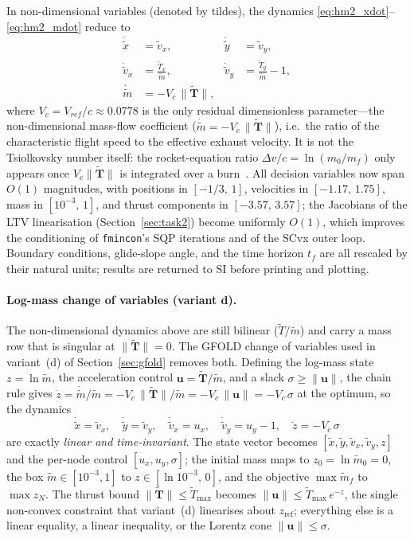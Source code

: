 \documentclass[../main.tex]{subfiles}
\begin{document}
In non-dimensional variables (denoted by tildes), the dynamics \eqref{eq:hm2_xdot}--\eqref{eq:hm2_mdot} reduce to
\begin{align}
    \dot{\tilde{x}}    &= \tilde{v}_x,
    & \dot{\tilde{y}}  &= \tilde{v}_y,\\
    \dot{\tilde{v}}_x  &= \frac{\tilde{T}_x}{\tilde{m}},
    & \dot{\tilde{v}}_y &= \frac{\tilde{T}_y}{\tilde{m}} - 1,\\
    \dot{\tilde{m}}    &= -V_c\,\|\tilde{\mathbf{T}}\|,
\end{align}
where $V_c = V_{ref}/c \approx 0.0778$ is the only residual dimensionless parameter---the non-dimensional mass-flow coefficient ($\dot{\tilde{m}} = -V_c\,\|\tilde{\mathbf{T}}\|$), i.e.\ the ratio of the characteristic flight speed to the effective exhaust velocity. It is not the Tsiolkovsky number itself: the rocket-equation ratio $\Delta v/c = \ln(m_0/m_f)$ only appears once $V_c\|\tilde{\mathbf{T}}\|$ is integrated over a burn~\cite[Sec.~3.8.3]{benedikter2022}. All decision variables now span $O(1)$ magnitudes, with positions in $[-1/3,\,1]$, velocities in $[-1.17,\,1.75]$, mass in $[10^{-3},\,1]$, and thrust components in $[-3.57,\,3.57]$; the Jacobians of the LTV linearisation (Section~\ref{sec:task2}) become uniformly $O(1)$, which improves the conditioning of \texttt{fmincon}'s SQP iterations and of the SCvx outer loop. Boundary conditions, glide-slope angle, and the time horizon $t_f$ are all rescaled by their natural units; results are returned to SI before printing and plotting.

\paragraph{Log-mass change of variables (variant d).} The non-dimensional dynamics above are still bilinear ($\tilde{T}/\tilde{m}$) and carry a mass row that is singular at $\|\tilde{\mathbf{T}}\|=0$. The GFOLD change of variables used in variant~(d) of Section~\ref{sec:gfold} removes both. Defining the log-mass state $z = \ln\tilde{m}$, the acceleration control $\mathbf{u} = \tilde{\mathbf{T}}/\tilde{m}$, and a slack $\sigma \geq \|\mathbf{u}\|$, the chain rule gives $\dot z = \dot{\tilde{m}}/\tilde{m} = -V_c\,\|\tilde{\mathbf{T}}\|/\tilde{m} = -V_c\,\|\mathbf{u}\| = -V_c\,\sigma$ at the optimum, so the dynamics
\begin{equation}
    \dot{\tilde{x}} = \tilde{v}_x,\quad
    \dot{\tilde{y}} = \tilde{v}_y,\quad
    \dot{\tilde{v}}_x = u_x,\quad
    \dot{\tilde{v}}_y = u_y - 1,\quad
    \dot{z} = -V_c\,\sigma
    \label{eq:impl_gfold_lti}
\end{equation}
are exactly \emph{linear and time-invariant}. The state vector becomes $[\tilde{x},\tilde{y},\tilde{v}_x,\tilde{v}_y,z]$ and the per-node control $[u_x,u_y,\sigma]$; the initial mass maps to $z_0 = \ln\tilde{m}_0 = 0$, the box $\tilde{m}\in[10^{-3},1]$ to $z\in[\ln 10^{-3},\,0]$, and the objective $\max\tilde{m}_f$ to $\max z_N$. The thrust bound $\|\tilde{\mathbf{T}}\|\leq\tilde{T}_{\max}$ becomes $\|\mathbf{u}\|\leq\tilde{T}_{\max}\,e^{-z}$, the single non-convex constraint that variant~(d) linearises about $z_{\mathrm{ref}}$; everything else is a linear equality, a linear inequality, or the Lorentz cone $\|\mathbf{u}\|\leq\sigma$.
\end{document}
